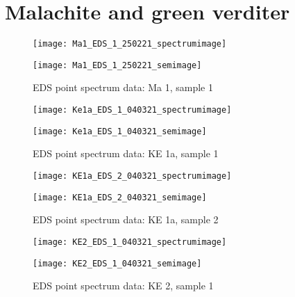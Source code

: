 \section{Malachite and green verditer}


\begin{figure}[H]
\centering
\begin{minipage}{.45\textwidth}
  \centering
  \texttt{[image: Ma1\_EDS\_1\_250221\_spectrumimage]}
\end{minipage}
\begin{minipage}{.45\textwidth}
  \centering
  \texttt{[image: Ma1\_EDS\_1\_250221\_semimage]}
\end{minipage}
\caption[EDS point spectrum data: Ma 1, sample 1]{EDS point spectrum data: Ma 1, sample 1}
\label{fig:ma1_point_eds_1}
\end{figure}



\begin{figure}[H]
\centering
\begin{minipage}{.45\textwidth}
  \centering
  \texttt{[image: Ke1a\_EDS\_1\_040321\_spectrumimage]}
\end{minipage}
\begin{minipage}{.45\textwidth}
  \centering
  \texttt{[image: Ke1a\_EDS\_1\_040321\_semimage]}
\end{minipage}
\caption[EDS point spectrum data: KE 1a, sample 1]{EDS point spectrum data: KE 1a, sample 1}
\label{fig:ke1a_point_eds_1}
\end{figure}

\begin{figure}[H]
\centering
\begin{minipage}{.45\textwidth}
  \centering
  \texttt{[image: KE1a\_EDS\_2\_040321\_spectrumimage]}
\end{minipage}
\begin{minipage}{.45\textwidth}
  \centering
  \texttt{[image: KE1a\_EDS\_2\_040321\_semimage]}
\end{minipage}
\caption[EDS point spectrum data: KE 1a, sample 2]{EDS point spectrum data: KE 1a, sample 2}
\label{fig:ke1a_point_eds_2}
\end{figure}



\begin{figure}[H]
\centering
\begin{minipage}{.45\textwidth}
  \centering
  \texttt{[image: KE2\_EDS\_1\_040321\_spectrumimage]}
\end{minipage}
\begin{minipage}{.45\textwidth}
  \centering
  \texttt{[image: KE2\_EDS\_1\_040321\_semimage]}
\end{minipage}
\caption[EDS point spectrum data: KE 2, sample 1]{EDS point spectrum data: KE 2, sample 1}
\label{fig:ke2_point_eds_1}
\end{figure}

